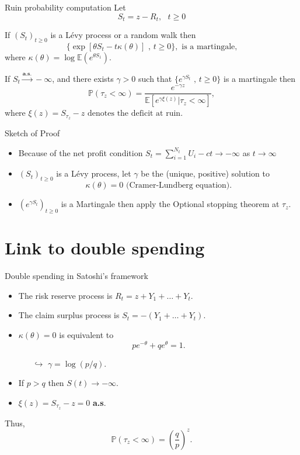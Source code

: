 \documentclass{beamer}
\begin{document}
\begin{frame}{Ruin probability computation}
\scriptsize
Let 
$$
S_t = z - R_t,\text{ }t\geq0
$$
\begin{tcolorbox}[enhanced,drop shadow, title=Theorem (Wald exponential martingale)]
If $(S_t)_{t\geq0}$ is a L\'evy process or a random walk then
$$
\{\exp\left[\theta S_t-t\kappa(\theta)\right]\text{ , }t\geq0\},\text{ is a martingale,}
$$
where $\kappa(\theta)=\log\mathbb{E}\left(e^{\theta S_1}\right)$.
\end{tcolorbox}
\begin{tcolorbox}[enhanced,drop shadow, title=Theorem (Representation of the ruin probability)]

If $S_t\overset{\textbf{a.s.}}{\rightarrow} -\infty$, and there exists $\gamma>0$ such that $\{e^{\gamma S_t}\text{ , }t\geq0\}$ is a martingale then
$$
\mathbb{P}(\tau_z<\infty)=\frac{e^{-\gamma z}}{\mathbb{E}\left[e^{\gamma \xi(z)}|\tau_z<\infty\right]},
$$
where $\xi(z)=S_{\tau_z}-z\text{ denotes the deficit at ruin.}$
\end{tcolorbox}
\end{frame}
\begin{frame}{Sketch of Proof}
\scriptsize
\begin{itemize}
\item Because of the net profit condition $S_t = \sum_{i=1}^{N_t}U_i-ct\rightarrow -\infty$ as $t\rightarrow\infty$
\item $(S_t)_{t\geq0}$ is a Lévy process, let $\gamma$ be the (unique, positive) solution to
$$
\kappa(\theta) = 0\text{ (Cramer-Lundberg equation)}.
$$
\item  $(e^{\gamma S_t})_{t\geq0}$ is a Martingale then apply the Optional stopping theorem at $\tau_z$.

\end{itemize}
\end{frame}
\section{Link to double spending}
\begin{frame}{Double spending in Satoshi's framework}
\scriptsize
\begin{itemize}
\item The risk reserve process is $R_t=z+Y_1+\ldots+Y_t.$
\item The claim surplus process is $S_t=-(Y_1+\ldots+Y_t).$
\item $\kappa(\theta)=0$ is equivalent to
$$pe^{-\theta}+qe^{\theta}=1.$$
\begin{itemize}
\item[$\hookrightarrow$]\scriptsize $\gamma=\log(p/q).$
\end{itemize}
\item If $p>q$ then $S(t)\rightarrow - \infty$.
\item  $\xi(z)=S_{\tau_z}-z=0$ \textbf{a.s}.
\end{itemize}
Thus,
$$\mathbb{P}(\tau_z<\infty)=\left(\frac{q}{p}\right)^{z}.$$
\end{frame}
\end{document}
